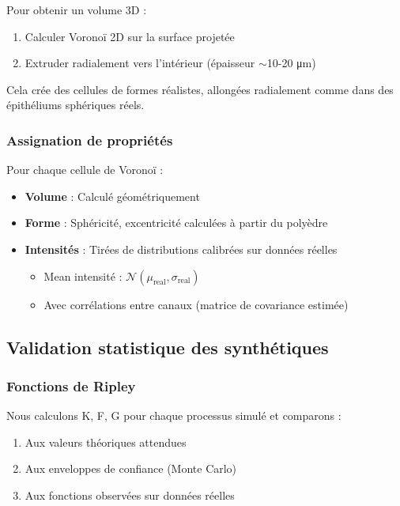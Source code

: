 Pour obtenir un volume 3D :
\begin{enumerate}
    \item Calculer Voronoï 2D sur la surface projetée
    \item Extruder radialement vers l'intérieur (épaisseur $\sim$10-20 μm)
\end{enumerate}

Cela crée des cellules de formes réalistes, allongées radialement comme dans des épithéliums sphériques réels.

\subsubsection{Assignation de propriétés}

Pour chaque cellule de Voronoï :
\begin{itemize}
    \item \textbf{Volume} : Calculé géométriquement
    \item \textbf{Forme} : Sphéricité, excentricité calculées à partir du polyèdre
    \item \textbf{Intensités} : Tirées de distributions calibrées sur données réelles
    \begin{itemize}
        \item Mean intensité : $\mathcal{N}(\mu_{\text{real}}, \sigma_{\text{real}})$
        \item Avec corrélations entre canaux (matrice de covariance estimée)
    \end{itemize}
\end{itemize}

\subsection{Validation statistique des synthétiques}

\subsubsection{Fonctions de Ripley}

Nous calculons K, F, G pour chaque processus simulé et comparons :
\begin{enumerate}
    \item Aux valeurs théoriques attendues
    \item Aux enveloppes de confiance (Monte Carlo)
    \item Aux fonctions observées sur données réelles
\end{enumerate}

